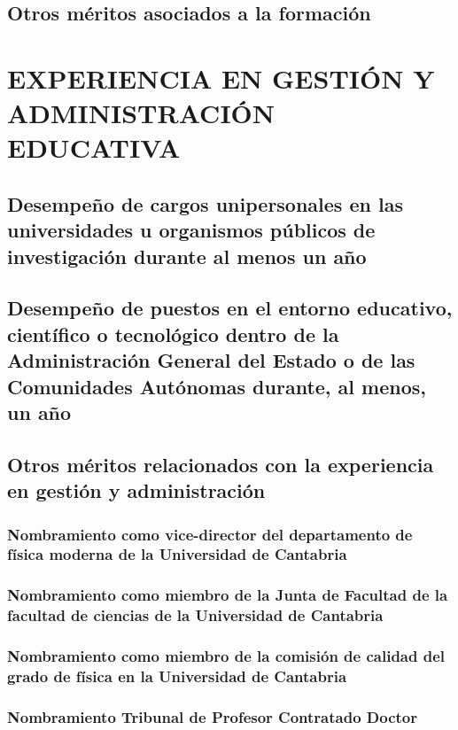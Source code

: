 \documentclass[a4paper, 11pt, twoside, openright]{report}
\begin{document}
\section{Otros méritos asociados a la formación}
	

\chapter{EXPERIENCIA EN GESTIÓN Y ADMINISTRACIÓN EDUCATIVA}

\section{Desempeño de cargos unipersonales en las universidades u organismos públicos de investigación durante al menos un año}

\section{Desempeño de puestos en el entorno educativo, científico o tecnológico dentro de la Administración General del Estado o de las Comunidades Autónomas durante, al menos, un año}

\section{Otros méritos relacionados con la experiencia en gestión y administración}

\subsection{Nombramiento como vice-director del departamento de física moderna de la Universidad de Cantabria}

\subsection{Nombramiento como miembro de la Junta de Facultad de la facultad de ciencias de la Universidad de Cantabria}

\subsection{Nombramiento como miembro de la comisión de calidad del grado de física en la Universidad de Cantabria}

\subsection{Nombramiento Tribunal de Profesor Contratado Doctor}

\end{document}
